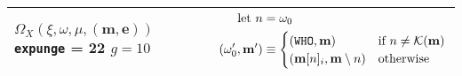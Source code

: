 \begin{longtable}{p{3.5cm} p{12.5cm}}
  \cmidrule(lr){1-1}\cmidrule(lr){2-2}
  \makecell*[l]{
  $\Omega_X(\xi, \omega, \mu, (\mathbf{m}, \mathbf{e}))$ \\
  \texttt{expunge} = 22 \\
  $g = 10$} &
  $\begin{aligned}
    \text{let } n &= \omega_{0} \\
    (\omega'_0, \mathbf{m}') &\equiv \begin{cases}
      (\mathtt{WHO}, \mathbf{m}) &\text{if } n \ne \mathcal{K}(\mathbf{m}) \\
      (\mathbf{m}[n]_i, \mathbf{m} \setminus n) &\text{otherwise} \\
    \end{cases} \\
  \end{aligned}$\\
  \bottomrule
\end{longtable}
